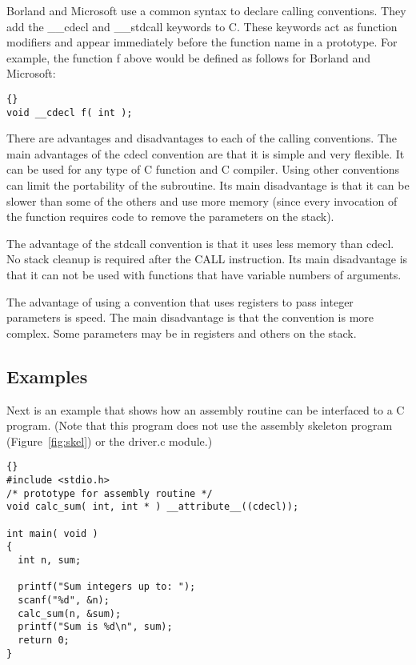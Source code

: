 Borland and Microsoft use a common syntax to declare calling
conventions.  They add the {\code \_\_cdecl} and {\code \_\_stdcall} keywords to C. These keywords act as function
modifiers and appear immediately before the function name in a
prototype. For example, the function {\code f} above would be defined
as follows for Borland and Microsoft:
\begin{lstlisting}[stepnumber=0]{}
void __cdecl f( int );
\end{lstlisting}

There are advantages and disadvantages to each of the calling
conventions.  The main advantages of the {\code cdecl} convention are that it is simple and very flexible. It
can be used for any type of C function and C compiler. Using other
conventions can limit the portability of the subroutine. Its main
disadvantage is that it can be slower than some of the others and use
more memory (since every invocation of the function requires code to
remove the parameters on the stack).

The advantage of the {\code stdcall} convention is that it uses less memory than
{\code cdecl}. No stack cleanup is required after the {\code CALL}
instruction. Its main disadvantage is that it can not be used with
functions that have variable numbers of arguments.

The advantage of using a convention that uses registers to pass integer
parameters is speed. The main disadvantage is that the convention is more
complex. Some parameters may be in registers and others on the stack.


\subsection{Examples}

Next is an example that shows how an assembly routine can be interfaced to
a C program. (Note that this program does not use the assembly skeleton
program (Figure~\ref{fig:skel}) or the driver.c module.)

\begin{lstlisting}{}
#include <stdio.h>
/* prototype for assembly routine */
void calc_sum( int, int * ) __attribute__((cdecl));

int main( void )
{
  int n, sum;

  printf("Sum integers up to: ");
  scanf("%d", &n);
  calc_sum(n, &sum);
  printf("Sum is %d\n", sum);
  return 0;
}
\end{lstlisting}

